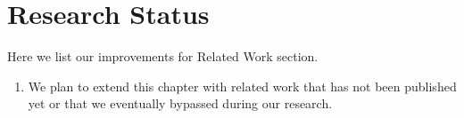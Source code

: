 \section{Research Status}
Here we list our improvements for Related Work section.

\begin{enumerate}
    \item We plan to extend this chapter with related work that has not been published yet or that we eventually bypassed during our research.
\end{enumerate}





